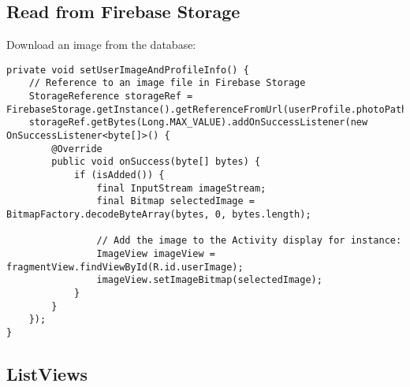 \documentclass[11pt]{article}
\begin{document}
\subsection{Read from Firebase Storage}
Download an image from the database:
\lstset{language = Java}
\begin{lstlisting}
private void setUserImageAndProfileInfo() {
	// Reference to an image file in Firebase Storage
	StorageReference storageRef = FirebaseStorage.getInstance().getReferenceFromUrl(userProfile.photoPath);
	storageRef.getBytes(Long.MAX_VALUE).addOnSuccessListener(new OnSuccessListener<byte[]>() {
		@Override
		public void onSuccess(byte[] bytes) {
			if (isAdded()) {
				final InputStream imageStream;
				final Bitmap selectedImage = BitmapFactory.decodeByteArray(bytes, 0, bytes.length);
				
				// Add the image to the Activity display for instance:
				ImageView imageView = fragmentView.findViewById(R.id.userImage);
				imageView.setImageBitmap(selectedImage);
			}
		}
	});
}
\end{lstlisting}

\subsection{ListViews} 
\end{document}
